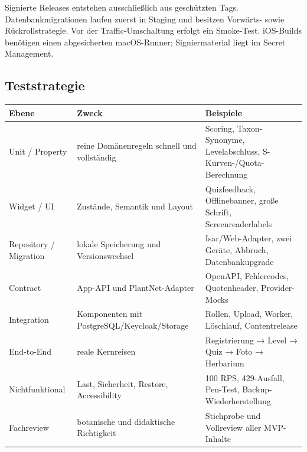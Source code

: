 \documentclass[10pt,a4paper,oneside]{article}
\begin{document}
\begin{center}
\end{center}

Signierte Releases entstehen ausschließlich aus geschützten Tags. Datenbankmigrationen laufen zuerst in Staging und besitzen Vorwärts- sowie Rückrollstrategie. Vor der Traffic-Umschaltung erfolgt ein Smoke-Test. iOS-Builds benötigen einen abgesicherten macOS-Runner; Signiermaterial liegt im Secret Management.

\subsection{Teststrategie}

\begin{tabularx}{\textwidth}{@{}p{32mm}X p{52mm}@{}}
\toprule
\textbf{Ebene} & \textbf{Zweck} & \textbf{Beispiele} \\
\midrule
Unit / Property & reine Domänenregeln schnell und vollständig & Scoring, Taxon-Synonyme, Levelabschluss, S-Kurven-/Quota-Berechnung \\
Widget / UI & Zustände, Semantik und Layout & Quizfeedback, Offlinebanner, große Schrift, Screenreaderlabels \\
Repository / Migration & lokale Speicherung und Versionswechsel & Isar/Web-Adapter, zwei Geräte, Abbruch, Datenbankupgrade \\
Contract & App-API und PlantNet-Adapter & OpenAPI, Fehlercodes, Quotenheader, Provider-Mocks \\
Integration & Komponenten mit PostgreSQL/Keycloak/Storage & Rollen, Upload, Worker, Löschlauf, Contentrelease \\
End-to-End & reale Kernreisen & Registrierung → Level → Quiz → Foto → Herbarium \\
Nichtfunktional & Last, Sicherheit, Restore, Accessibility & 100 RPS, 429-Ausfall, Pen-Test, Backup-Wiederherstellung \\
Fachreview & botanische und didaktische Richtigkeit & Stichprobe und Vollreview aller MVP-Inhalte \\
\bottomrule
\end{tabularx}
\end{document}
